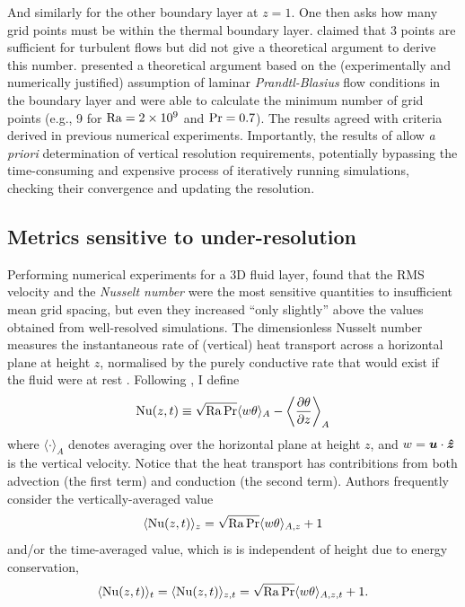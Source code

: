 \documentclass[../main.tex]{subfiles}
\begin{document}
And similarly for the other boundary layer at $z=1$. One then asks how many
grid points must be within the thermal boundary layer.
\citeauthor{grotzbach1983} claimed that 3 points are sufficient for turbulent
flows but did not give a theoretical argument to derive this number.
\textcite{shishkina2010} presented a theoretical argument based on the
(experimentally and numerically justified) assumption of laminar
\emph{Prandtl-Blasius} flow conditions in the boundary layer and were able to
calculate the minimum number of grid points (e.g., 9 for $\mathrm{Ra} =
\SI{2e9}{}$ and $\mathrm{Pr} = 0.7$). The results agreed with criteria derived in
previous numerical experiments. Importantly, the results of
\citeauthor{shishkina2010} allow \emph{a priori} determination of vertical
resolution requirements, potentially bypassing the time-consuming and expensive
process of iteratively running simulations, checking their convergence and
updating the resolution.


\subsection{Metrics sensitive to under-resolution} \label{sec:metrics}
Performing numerical experiments for a 3D fluid layer,
\citeauthor{grotzbach1983} found that the RMS velocity and the \emph{Nusselt
number} were the most sensitive quantities to insufficient mean grid spacing,
but even they increased ``only slightly'' above the values obtained from
well-resolved simulations. The dimensionless Nusselt number measures the
instantaneous rate of (vertical) heat transport across a horizontal plane at
height $z$, normalised by the purely conductive rate that would exist if the
fluid were at rest \parencite{verzicco1999}. Following \textcite{kooij2018}, I
define
\[
    \mathrm{Nu}(z,t) \equiv \sqrt{\mathrm{Ra}\,\mathrm{Pr}} \langle w \theta \rangle _A
        - \left\langle \frac{\partial \theta}{\partial z} \right\rangle _A
\]
where $\langle \cdot \rangle _A$ denotes averaging over the horizontal plane at
height $z$, and $w = \bm{u} \cdot \bm{\hat{z}}$ is the vertical velocity. Notice
that the heat transport has contribitions from both advection (the first term)
and conduction (the second term). Authors frequently consider the
vertically-averaged value
\begin{equation} \label{eqn:nusselt_zavg}
    \langle \mathrm{Nu}(z,t) \rangle _z
        = \sqrt{\mathrm{Ra}\,\mathrm{Pr}} \langle w \theta \rangle _{A,z} + 1
\end{equation}
and/or the time-averaged value, which is is independent of height due to
energy conservation,
\[
    \langle \mathrm{Nu}(z,t) \rangle _t = \langle \mathrm{Nu}(z,t) \rangle _{z,t}
        = \sqrt{\mathrm{Ra}\,\mathrm{Pr}} \langle w \theta \rangle _{A,z,t} + 1.
\]
\end{document}
